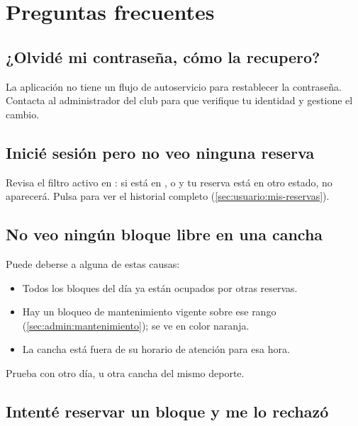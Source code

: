 
\section{Preguntas frecuentes}
\label{sec:faq}

\subsection*{¿Olvidé mi contraseña, cómo la recupero?}

La aplicación no tiene un flujo de autoservicio para restablecer la
contraseña. Contacta al administrador del club para que verifique tu
identidad y gestione el cambio.

\subsection*{Inicié sesión pero no veo ninguna reserva}

Revisa el filtro activo en : si está en
,  o  y tu reserva
está en otro estado, no aparecerá. Pulsa  para ver el
historial completo (\cref{sec:usuario:mis-reservas}).

\subsection*{No veo ningún bloque libre en una cancha}

Puede deberse a alguna de estas causas:

\begin{itemize}
  \item Todos los bloques del día ya están ocupados por otras reservas.
  \item Hay un bloqueo de mantenimiento vigente sobre ese rango
        (\cref{sec:admin:mantenimiento}); se ve en color naranja.
  \item La cancha está fuera de su horario de atención para esa hora.
\end{itemize}

Prueba con otro día, u otra cancha del mismo deporte.

\subsection*{Intenté reservar un bloque y me lo rechazó}

